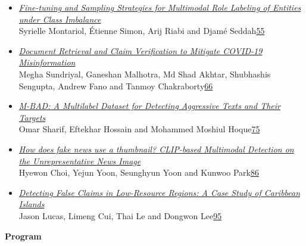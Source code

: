 \documentclass[11pt,oneside]{book}
\begin{document}
\begin{itemize}[leftmargin=*,label={}]
       \item \hyperlink{page.55}{\emph{Fine-tuning and Sampling Strategies for Multimodal Role Labeling of Entities under Class Imbalance}}\\ \hspace*{2em} Syrielle Montariol, Étienne Simon, Arij Riabi and Djamé Seddah\dotfill \hyperlink{page.55}{55}
       \item \hyperlink{page.66}{\emph{Document Retrieval and Claim Verification to Mitigate COVID-19 Misinformation}}\\ \hspace*{2em} Megha Sundriyal, Ganeshan Malhotra, Md Shad Akhtar, Shubhashis Sengupta, Andrew Fano and Tanmoy Chakraborty\dotfill \hyperlink{page.66}{66}
       \item \hyperlink{page.75}{\emph{M-BAD: A Multilabel Dataset for Detecting Aggressive Texts and Their Targets}}\\ \hspace*{2em} Omar Sharif, Eftekhar Hossain and Mohammed Moshiul Hoque\dotfill \hyperlink{page.75}{75}
       \item \hyperlink{page.86}{\emph{How does fake news use a thumbnail? CLIP-based Multimodal Detection on the Unrepresentative News Image}}\\ \hspace*{2em} Hyewon Choi, Yejun Yoon, Seunghyun Yoon and Kunwoo Park\dotfill \hyperlink{page.86}{86}
       \item \hyperlink{page.95}{\emph{Detecting False Claims in Low-Resource Regions: A Case Study of Caribbean Islands}}\\ \hspace*{2em} Jason Lucas, Limeng Cui, Thai Le and Dongwon Lee\dotfill \hyperlink{page.95}{95}
  \end{itemize}
\newpage

\renewcommand{\baselinestretch}{0.87}
\setlength{\parindent}{0in}
\setlength{\parskip}{2ex}

\begin{center}
{\Large \textbf{Program}}
\end{center}
\vspace*{0.5em}
\end{document}
